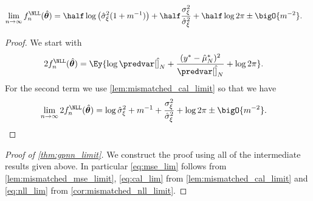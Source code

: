 \begin{corollary}
    \label{cor:mismatched_nll_limit}
    \begin{align*}
    \lim_{n\rightarrow\infty}f_n^{\NLL}(\hat{\bm{\theta}}) &= \half\log\left(\hat{\sigma}_\xi^2(1 + m^{-1})\right) + \half\frac{\sigma_\xi^2}{\hat{\sigma}_\xi^2} +\half\log2\pi \pm \bigO{m^{-2}}. 
    \end{align*}
\end{corollary}
\begin{proof}\label{proof:mismatched_nll_limit}
We start with
    \begin{align*}
        2f_n^{\NLL}(\hat{\bm{\theta}}) &= \Ey{\log\predvar[\hat]_N + \frac{(y^*-\hat{\mu}_N^*)^2}{\predvar[\hat]_N} + \log2\pi}.
    \end{align*}
        For the second term we use \autoref{lem:mismatched_cal_limit} so that we have 
    \begin{align*}
        \lim_{n\rightarrow\infty}2f_n^{\NLL}(\hat{\bm{\theta}}) &= \log\hat{\sigma}_\xi^2 +  m^{-1} + \frac{\sigma_\xi^2}{\hat{\sigma}_\xi^2} +\log2\pi \pm \bigO{m^{-2}}.
    \end{align*}
\end{proof}

\begin{proof}[Proof of \autoref{thm:gpnn_limit}]\label{proof:gpnn_limit}
    We construct the proof using all of the intermediate results given above. In particular \autoref{eq:mse_lim} follows from \autoref{lem:mismatched_mse_limit}, \autoref{eq:cal_lim} from \autoref{lem:mismatched_cal_limit} and \autoref{eq:nll_lim} from \autoref{cor:mismatched_nll_limit}.
\end{proof}

